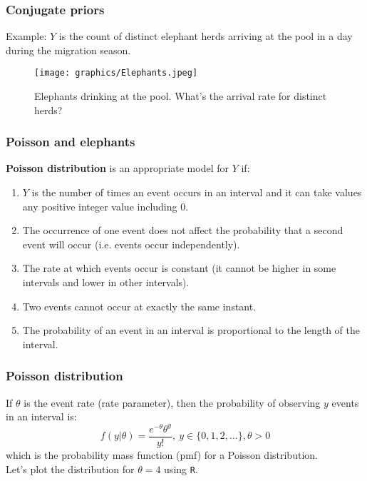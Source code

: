 \documentclass{beamer}
\newcommand{\1}{\ensuremath{\mathbf{1}}}
\begin{document}
%
%
%
\begin{frame}\frametitle{Conjugate priors}
	Example: $Y$ is the count of distinct elephant herds arriving at the pool in a day during the migration season.
	\begin{figure}
	\begin{center}
		\texttt{[image: graphics/Elephants.jpeg]}
	\end{center}
	\caption{Elephants drinking at the pool. What’s the arrival rate for distinct herds?}
	\end{figure}
\end{frame}
%
%
%
\begin{frame}\frametitle{Poisson and elephants}
	\textbf{Poisson distribution} is an appropriate model for $Y$ if:
	\begin{enumerate}
		\item $Y$ is the number of times an event occurs in an interval and it can take values any positive integer value including 0.
		\item The occurrence of one event does not affect the probability that a second event will occur (i.e. events occur independently).
		\item The rate at which events occur is constant (it cannot be higher in some intervals and lower in other intervals).
		\item Two events cannot occur at exactly the same instant.
		\item The probability of an event in an interval is proportional to the length of the interval.
	\end{enumerate}
\end{frame}
%
%
%
\begin{frame}\frametitle{Poisson distribution}
	If $\theta$ is the event rate (rate parameter), then the probability of observing $y$ events in an interval is:
	\begin{equation}
		f(y|\theta) = \frac{e^{-\theta}\theta^y}{y!}, \: y \in \{0,1,2,\ldots\}, \theta > 0
	\end{equation}
	which is the probability mass function (pmf) for a Poisson distribution.\\[3ex]
	Let’s plot the distribution for $\theta = 4$ using \texttt{R}.
\end{frame}
\end{document}
